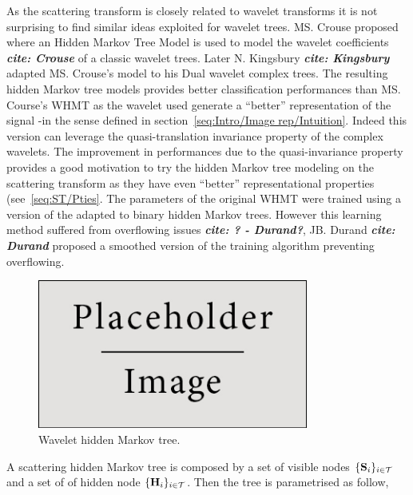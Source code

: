 \documentclass[a4paper,11pt]{report}
\begin{document}
{		As the scattering transform is closely related to wavelet transforms it is not surprising to find similar ideas exploited for wavelet trees. MS. Crouse proposed where an Hidden Markov Tree Model is used to model the wavelet coefficients \textbf{\textit{cite: Crouse}} of a classic wavelet trees. Later N. Kingsbury \textbf{\textit{cite: Kingsbury}} adapted MS. Crouse's model to his Dual wavelet complex trees. The resulting hidden Markov tree models provides better classification performances than MS. Course's WHMT as the wavelet used generate a ``better'' representation of the signal -in the sense defined in section~\ref{seq:Intro/Image rep/Intuition}. Indeed this version can leverage the quasi-translation invariance property of the complex wavelets. The improvement in performances due to the quasi-invariance property provides a good motivation to try the hidden Markov tree modeling on the scattering transform as they have even ``better'' representational properties (see~\ref{seq:ST/Pties}. The parameters of the original WHMT were trained using a version of the  adapted to binary hidden Markov trees. However this learning method suffered from overflowing issues \textbf{\textit{cite: ? - Durand?}}, JB. Durand \textbf{\textit{cite: Durand}} proposed a smoothed version of the training algorithm preventing overflowing.\\
   
		\begin{figure}
				\begin{center}
					\includegraphics[width=3.5in]{placeholder.jpg}
					\caption{Wavelet hidden Markov tree.} %
					\label{fig:WHMT}
				\end{center}
		\end{figure}
	  
	  A scattering hidden Markov tree is composed by a set of visible nodes $\{{\bf S}_{i}\}_{i \in \mathcal{T}}$ and a set of of hidden node $\{{\bf H}_{i}\}_{i \in \mathcal{T}}$. Then the tree is parametrised as follow,
	  
}
\end{document}
